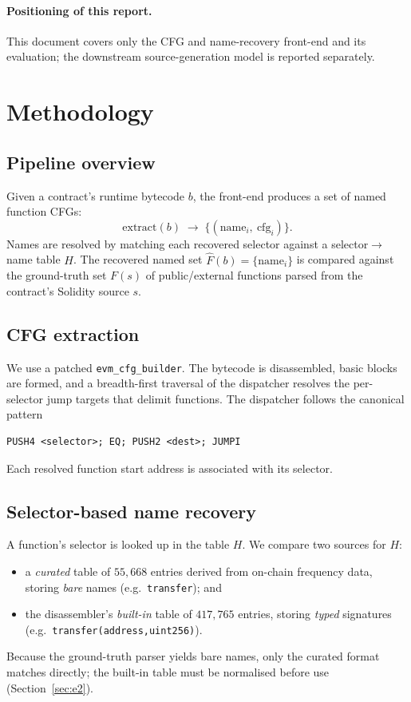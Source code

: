 \documentclass[10pt,conference]{article}
\begin{document}
\paragraph{Positioning of this report.}
This document covers only the CFG and name-recovery front-end and its evaluation;
the downstream source-generation model is reported separately.

\section{Methodology}

\subsection{Pipeline overview}
Given a contract's runtime bytecode $b$, the front-end produces a set of named
function CFGs:
\[
\text{extract}(b) \;\rightarrow\; \{ (\text{name}_i,\ \text{cfg}_i) \}.
\]
Names are resolved by matching each recovered selector against a
selector$\rightarrow$name table $H$. The recovered named set
$\widehat{F}(b)=\{\text{name}_i\}$ is compared against the ground-truth set
$F(s)$ of public/external functions parsed from the contract's Solidity source
$s$.

\subsection{CFG extraction}
We use a patched \texttt{evm\_cfg\_builder}. The bytecode is disassembled,
basic blocks are formed, and a breadth-first traversal of the dispatcher
resolves the per-selector jump targets that delimit functions. The dispatcher
follows the canonical pattern
\begin{lstlisting}[style=evm]
PUSH4 <selector>; EQ; PUSH2 <dest>; JUMPI
\end{lstlisting}
Each resolved function start address is associated with its selector.

\subsection{Selector-based name recovery}
A function's selector is looked up in the table $H$. We compare two sources for
$H$:
\begin{itemize}
  \item a \emph{curated} table of $55{,}668$ entries derived from on-chain
        frequency data, storing \emph{bare} names (e.g.\ \texttt{transfer}); and
  \item the disassembler's \emph{built-in} table of $417{,}765$ entries, storing
        \emph{typed} signatures (e.g.\ \texttt{transfer(address,uint256)}).
\end{itemize}
Because the ground-truth parser yields bare names, only the curated format
matches directly; the built-in table must be normalised before use
(Section~\ref{sec:e2}).
\end{document}
